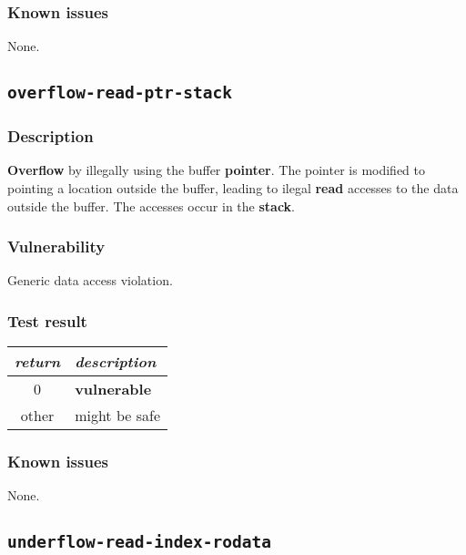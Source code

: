 \documentclass[a4paper]{book}
\begin{document}
\subsubsection{Known issues}

None.

\newpage

\subsection{\texttt{overflow-read-ptr-stack}}\label{test-overflow-read-ptr-stack}

\subsubsection{Description}

\textbf{Overflow} by illegally using the buffer \textbf{pointer}.
The pointer is modified to pointing a location outside the buffer,
leading to ilegal \textbf{read} accesses to the data outside the buffer.
The accesses occur in the \textbf{stack}.

\subsubsection{Vulnerability}
Generic data access violation.

\subsubsection{Test result}

\begin{tabular}{cl}
  \toprule
  \emph{return}  & \emph{description} \\
  \midrule
  0              & \textbf{vulnerable} \\
  other          & might be safe \\
  \bottomrule
\end{tabular}

\subsubsection{Known issues}

None.

\newpage

\subsection{\texttt{underflow-read-index-rodata}}\label{test-underflow-read-index-rodata}
\end{document}
